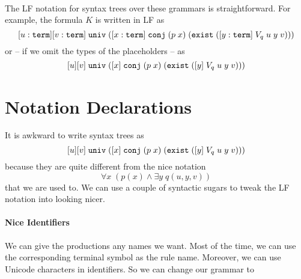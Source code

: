 \begin{twelfsig}
\decl{\FORM}{\type} \\
\decl{\TERM}{\type} \\
\\
\\
\\
\\
\\
\\
\\
\\
\\
  \\
 \\
\end{twelfsig}


The LF notation for syntax trees over these grammars is straightforward. For example, the formula $K$ is written in LF as 
\[[u:\mathtt{term}][v:\mathtt{term}]\;\mathtt{univ}\;([x:\mathtt{term}]\;\mathtt{conj}\;(p\;x)\;(\mathtt{exist}\;([y:\mathtt{term}]\;V_q\;u\;y\;v)))\]
or -- if we omit the types of the placeholders -- as
\[[u][v]\;\mathtt{univ}\;([x]\;\mathtt{conj}\;(p\;x)\;(\mathtt{exist}\;([y]\;V_q\;u\;y\;v)))\]

\section{Notation Declarations}

It is awkward to write syntax trees as
\[[u][v]\;\mathtt{univ}\;([x]\;\mathtt{conj}\;(p\;x)\;(\mathtt{exist}\;([y]\;V_q\;u\;y\;v)))\]
because they are quite different from the nice notation
\[\forall x\;(p(x) \wedge \exists y\;q(u,y,v))\]
that we are used to. We can use a couple of syntactic sugars to tweak the LF notation into looking nicer.

\paragraph{Nice Identifiers}
We can give the productions any names we want. Most of the time, we can use the corresponding terminal symbol as the rule name. Moreover, we can use Unicode characters in identifiers. So we can change our grammar to

